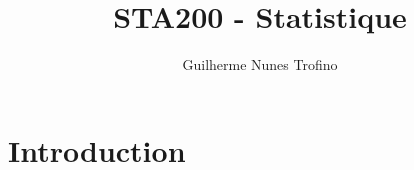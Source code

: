 \documentclass{article}
\title{STA200 - Statistique}
\author{Guilherme Nunes Trofino}
\begin{document}
\maketitle

\newpage\tableofcontents

\section{Introduction}
\end{document}
